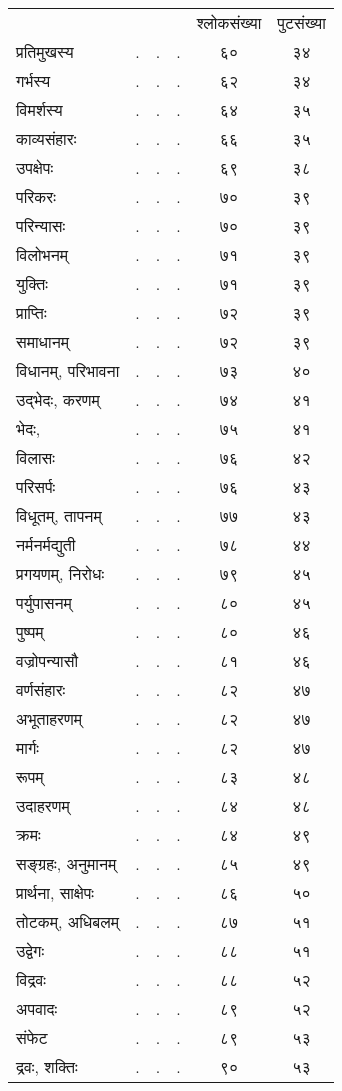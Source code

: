 \documentclass[11pt, openany]{book}
\begin{document}

\newpage
\lfoot{}
\fancyhead[CE,CO]{\thepage}
\setcounter{page}{6}
\renewcommand{\thepage}{\roman{page}}

\begin{center}
\begin{tabular}{m{10em} m{2em} m{2em} m{2em} c c}
& & & & श्लोकसंख्या & पुटसंख्या\\
प्रतिमुखस्य& .& .& .& ६०& ३४ \\
गर्भस्य& .& .& .& ६२& ३४\\
विमर्शस्य& .& .& .& ६४& ३५\\
काव्यसंहारः& .& .& . &६६ &३५\\
उपक्षेपः& .& .& .& ६९& ३८\\
परिकरः &.& . &. &७० &३९\\
परिन्यासः& .& .& .& ७०& ३९\\
विलोभनम्& .& .& .& ७१ &३९\\
युक्तिः& .& .& .& ७१ &३९\\
प्राप्तिः &. &. &. &७२& ३९\\
समाधानम् &.& .& .& ७२ &३९\\
विधानम्, परिभावना& .& . &. &७३ &४०\\
उद्भेदः, करणम्& .& .& . &७४ &४१\\
भेदः,& . &. &. &७५& ४१\\
विलासः &. &. &. &७६ &४२\\
परिसर्पः& .& .& .& ७६& ४३\\
विधूतम्, तापनम्& .& .& .& ७७& ४३\\
नर्मनर्मद्युती& .& .& .& ७८& ४४\\
प्रगयणम्, निरोधः &. &. &. &७९ &४५\\
पर्युपासनम्& . &. &. &८० &४५\\
पुष्पम् &. &. &. &८० &४६\\
वज्रोपन्यासौ& .& .& .& ८१ &४६\\
वर्णसंहारः& .& .& .& ८२& ४७\\
अभूताहरणम्& .& .& .& ८२ &४७\\
मार्गः& . &. &. &८२ &४७\\
रूपम्& .&. &. &८३ &४८\\
उदाहरणम् &. &. &. &८४ &४८\\
क्रमः& .& . &. &८४ &४९\\
सङ्ग्रहः, अनुमानम् &. &. &. &८५ &४९\\
प्रार्थना, साक्षेपः &. &. &. &८६ &५०\\
तोटकम्, अधिबलम्& . &. &.&८७ &५१\\
उद्वेगः& .& .& .& ८८ &५१\\
विद्रवः& .& .& .& ८८ &५२\\
अपवादः &. &. &. &८९ &५२\\
संफेट& .& .& .& ८९ &५३\\
द्रवः, शक्तिः& .& .& .& ९० &५३
\end{tabular}
\end{center}
\end{document}
